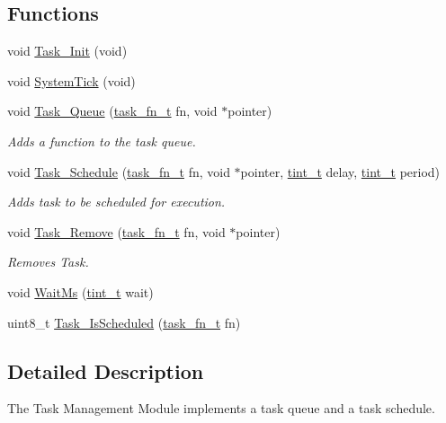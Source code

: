 \subsection*{Functions}
\begin{DoxyCompactItemize}
\item 
void \hyperlink{group__task_gaa6ab5350efe602f7bdfdca42aa57aff2}{Task\+\_\+\+Init} (void)
\item 
void \hyperlink{group__task_gafd2aa563748d1ede229e5867753ead5d}{System\+Tick} (void)
\item 
void \hyperlink{group__task_gac52c4f77f95df13332873382c71e82dc}{Task\+\_\+\+Queue} (\hyperlink{group__task_ga318336c763a22ea5f1c49c52ac5b6fe2}{task\+\_\+fn\+\_\+t} fn, void $\ast$pointer)
\begin{DoxyCompactList}\small\item\em Adds a function to the task queue. \end{DoxyCompactList}\item 
void \hyperlink{group__task_gadbe36e55ccb027326512672c71bf7ff3}{Task\+\_\+\+Schedule} (\hyperlink{group__task_ga318336c763a22ea5f1c49c52ac5b6fe2}{task\+\_\+fn\+\_\+t} fn, void $\ast$pointer, \hyperlink{group__timing_gaef97c9386393beb1be4ed0b1513ee481}{tint\+\_\+t} delay, \hyperlink{group__timing_gaef97c9386393beb1be4ed0b1513ee481}{tint\+\_\+t} period)
\begin{DoxyCompactList}\small\item\em Adds task to be scheduled for execution. \end{DoxyCompactList}\item 
void \hyperlink{group__task_ga7b397e2ec76a8f3899118305a113e76e}{Task\+\_\+\+Remove} (\hyperlink{group__task_ga318336c763a22ea5f1c49c52ac5b6fe2}{task\+\_\+fn\+\_\+t} fn, void $\ast$pointer)
\begin{DoxyCompactList}\small\item\em Removes Task. \end{DoxyCompactList}\item 
void \hyperlink{group__task_ga51a214a49e3bca310762452c27c47c90}{Wait\+Ms} (\hyperlink{group__timing_gaef97c9386393beb1be4ed0b1513ee481}{tint\+\_\+t} wait)
\item 
uint8\+\_\+t \hyperlink{group__task_gaef3188aaf35028172b18eec278647c7e}{Task\+\_\+\+Is\+Scheduled} (\hyperlink{group__task_ga318336c763a22ea5f1c49c52ac5b6fe2}{task\+\_\+fn\+\_\+t} fn)
\end{DoxyCompactItemize}


\subsection{Detailed Description}
The Task Management Module implements a task queue and a task schedule. 

